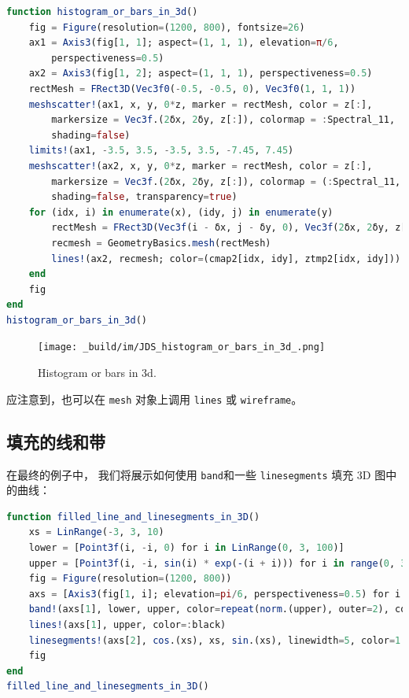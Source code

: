 \documentclass[
  notoc %
]{tufte-book}
\newcommand{\passthrough}[1]{#1}
\begin{document}
\begin{lstlisting}[language=Julia]
function histogram_or_bars_in_3d()
    fig = Figure(resolution=(1200, 800), fontsize=26)
    ax1 = Axis3(fig[1, 1]; aspect=(1, 1, 1), elevation=π/6,
        perspectiveness=0.5)
    ax2 = Axis3(fig[1, 2]; aspect=(1, 1, 1), perspectiveness=0.5)
    rectMesh = FRect3D(Vec3f0(-0.5, -0.5, 0), Vec3f0(1, 1, 1))
    meshscatter!(ax1, x, y, 0*z, marker = rectMesh, color = z[:],
        markersize = Vec3f.(2δx, 2δy, z[:]), colormap = :Spectral_11,
        shading=false)
    limits!(ax1, -3.5, 3.5, -3.5, 3.5, -7.45, 7.45)
    meshscatter!(ax2, x, y, 0*z, marker = rectMesh, color = z[:],
        markersize = Vec3f.(2δx, 2δy, z[:]), colormap = (:Spectral_11, 0.25),
        shading=false, transparency=true)
    for (idx, i) in enumerate(x), (idy, j) in enumerate(y)
        rectMesh = FRect3D(Vec3f(i - δx, j - δy, 0), Vec3f(2δx, 2δy, z[idx, idy]))
        recmesh = GeometryBasics.mesh(rectMesh)
        lines!(ax2, recmesh; color=(cmap2[idx, idy], ztmp2[idx, idy]))
    end
    fig
end
histogram_or_bars_in_3d()
\end{lstlisting}

\begin{figure}
\hypertarget{fig:histogram_or_bars_in_3d}{%
\centering
\texttt{[image: \_build/im/JDS\_histogram\_or\_bars\_in\_3d\_.png]}
\caption{Histogram or bars in 3d.}\label{fig:histogram_or_bars_in_3d}
}
\end{figure}

应注意到，也可以在 \passthrough{\lstinline!mesh!} 对象上调用
\passthrough{\lstinline!lines!} 或 \passthrough{\lstinline!wireframe!}。

\hypertarget{ux586bux5145ux7684ux7ebfux548cux5e26}{%
\subsection{填充的线和带}\label{ux586bux5145ux7684ux7ebfux548cux5e26}}

在最终的例子中， 我们将展示如何使用 \passthrough{\lstinline!band!}和一些
\passthrough{\lstinline!linesegments!} 填充 3D 图中的曲线：

\begin{lstlisting}[language=Julia]
function filled_line_and_linesegments_in_3D()
    xs = LinRange(-3, 3, 10)
    lower = [Point3f(i, -i, 0) for i in LinRange(0, 3, 100)]
    upper = [Point3f(i, -i, sin(i) * exp(-(i + i))) for i in range(0, 3, length=100)]
    fig = Figure(resolution=(1200, 800))
    axs = [Axis3(fig[1, i]; elevation=pi/6, perspectiveness=0.5) for i = 1:2]
    band!(axs[1], lower, upper, color=repeat(norm.(upper), outer=2), colormap=:CMRmap)
    lines!(axs[1], upper, color=:black)
    linesegments!(axs[2], cos.(xs), xs, sin.(xs), linewidth=5, color=1:length(xs))
    fig
end
filled_line_and_linesegments_in_3D()
\end{lstlisting}
\end{document}
